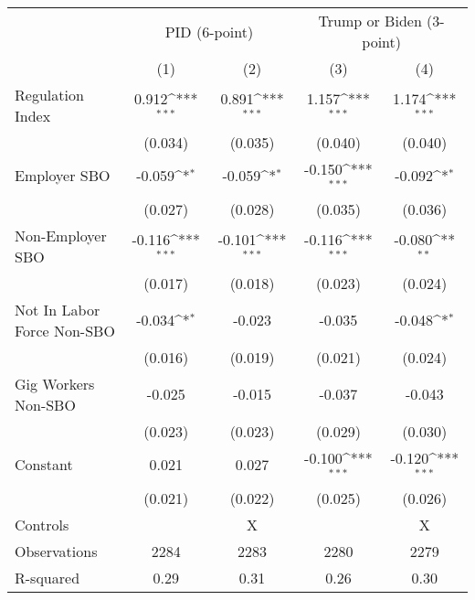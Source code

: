 {
\def\sym#1{\ifmmode^{#1}\else\(^{#1}\)\fi}
\begin{tabular}{l*{4}{c}}
\hline\hline
                    &\multicolumn{2}{c}{PID (6-point)}          &\multicolumn{2}{c}{Trump or Biden (3-point)}\\
                    &\multicolumn{1}{c}{(1)}         &\multicolumn{1}{c}{(2)}         &\multicolumn{1}{c}{(3)}         &\multicolumn{1}{c}{(4)}         \\
\hline
Regulation Index    &       0.912\sym{***}&       0.891\sym{***}&       1.157\sym{***}&       1.174\sym{***}\\
                    &     (0.034)         &     (0.035)         &     (0.040)         &     (0.040)         \\
Employer SBO        &      -0.059\sym{*}  &      -0.059\sym{*}  &      -0.150\sym{***}&      -0.092\sym{*}  \\
                    &     (0.027)         &     (0.028)         &     (0.035)         &     (0.036)         \\
Non-Employer SBO    &      -0.116\sym{***}&      -0.101\sym{***}&      -0.116\sym{***}&      -0.080\sym{**} \\
                    &     (0.017)         &     (0.018)         &     (0.023)         &     (0.024)         \\
Not In Labor Force Non-SBO&      -0.034\sym{*}  &      -0.023         &      -0.035         &      -0.048\sym{*}  \\
                    &     (0.016)         &     (0.019)         &     (0.021)         &     (0.024)         \\
Gig Workers Non-SBO &      -0.025         &      -0.015         &      -0.037         &      -0.043         \\
                    &     (0.023)         &     (0.023)         &     (0.029)         &     (0.030)         \\
Constant            &       0.021         &       0.027         &      -0.100\sym{***}&      -0.120\sym{***}\\
                    &     (0.021)         &     (0.022)         &     (0.025)         &     (0.026)         \\
\hline
Controls            &                     &           X         &                     &           X         \\
Observations        &        2284         &        2283         &        2280         &        2279         \\
R-squared           &        0.29         &        0.31         &        0.26         &        0.30         \\
\hline\hline
\end{tabular}
}
